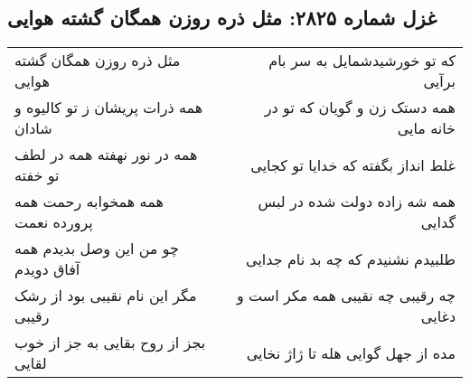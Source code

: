 \begin{center}
\section*{غزل شماره ۲۸۲۵: مثل ذره روزن همگان گشته هوایی}
\label{sec:2825}
\begin{longtable}{l p{0.5cm} r}
مثل ذره روزن همگان گشته هوایی
&&
که تو خورشیدشمایل به سر بام برآیی
\\
همه ذرات پریشان ز تو کالیوه و شادان
&&
همه دستک زن و گویان که تو در خانه مایی
\\
همه در نور نهفته همه در لطف تو خفته
&&
غلط انداز بگفته که خدایا تو کجایی
\\
همه همخوابه رحمت همه پرورده نعمت
&&
همه شه زاده دولت شده در لبس گدایی
\\
چو من این وصل بدیدم همه آفاق دویدم
&&
طلبیدم نشنیدم که چه بد نام جدایی
\\
مگر این نام نقیبی بود از رشک رقیبی
&&
چه رقیبی چه نقیبی همه مکر است و دغایی
\\
بجز از روح بقایی به جز از خوب لقایی
&&
مده از جهل گوایی هله تا ژاژ نخایی
\\
\end{longtable}
\end{center}
